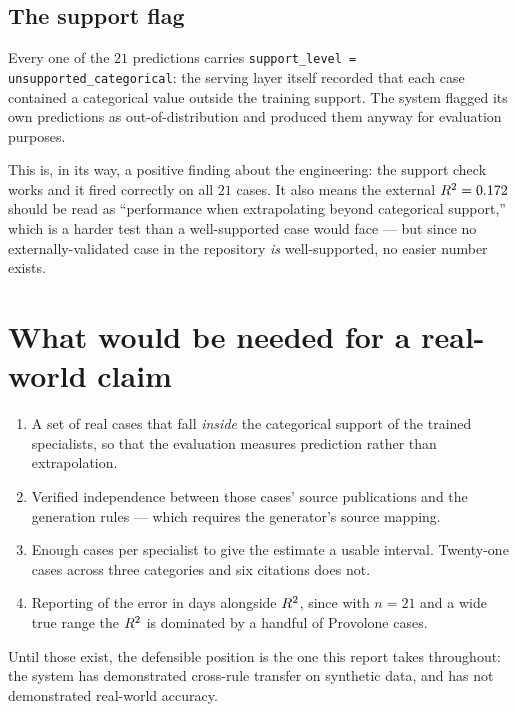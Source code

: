 \subsection{The support flag}

Every one of the $21$ predictions carries
\texttt{support\_level = unsupported\_categorical}: the serving layer
itself recorded that each case contained a categorical value outside the
training support. The system flagged its own predictions as
out-of-distribution and produced them anyway for evaluation purposes.

This is, in its way, a positive finding about the engineering: the support
check works and it fired correctly on all $21$ cases. It also means the
external $R^2 = 0.172$ should be read as ``performance when
extrapolating beyond categorical support,'' which is a harder test than a
well-supported case would face --- but since no externally-validated case
in the repository \emph{is} well-supported, no easier number exists.

\section{What would be needed for a real-world claim}

\begin{enumerate}[leftmargin=1.5em, itemsep=2pt]
\item A set of real cases that fall \emph{inside} the categorical support
  of the trained specialists, so that the evaluation measures prediction
  rather than extrapolation.
\item Verified independence between those cases' source publications and
  the generation rules --- which requires the generator's source mapping.
\item Enough cases per specialist to give the estimate a usable interval.
  Twenty-one cases across three categories and six citations does not.
\item Reporting of the error in days alongside $R^2$, since with $n=21$
  and a wide true range the $R^2$ is dominated by a handful of Provolone
  cases.
\end{enumerate}

Until those exist, the defensible position is the one this report takes
throughout: the system has demonstrated cross-rule transfer on synthetic
data, and has not demonstrated real-world accuracy.
